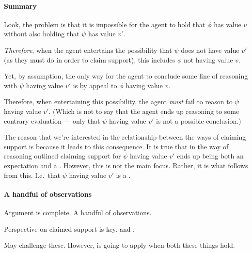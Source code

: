 \paragraph{Summary}

\begin{note}[To summarise]
  Look, the problem is that it is impossible for the agent to hold that \(\phi\) has value \(v\) without also holding that \(\psi\) has value \(v'\).

  \emph{Therefore}, when the agent entertains the possibility that \(\psi\) does not have value \(v'\) (as they must do in order to claim support), this includes \(\phi\) not having value \(v\).

  Yet, by assumption, the only way for the agent to conclude some line of reasoning with \(\psi\) having value \(v'\) is by appeal to \(\phi\) having value \(v\).

  Therefore, when entertaining this possibility, the agent \emph{must} fail to reason to \(\psi\) having value \(v'\).
  (Which is not to say that the agent ends up reasoning to some contrary evaluation --- only that \(\psi\) having value \(v'\) is not a possible conclusion.)

  The reason that we're interested in the relationship between the ways of claiming support is because it leads to this consequence.
  It is true that in the way of reasoning outlined claiming support for \(\psi\) having value \(v'\) ends up being both an expectation and a \requ{}.
  However, this is not the main focus.
  Rather, it is what follows from this.
  I.e.\ that \(\psi\) having value \(v'\) is a \requ{}.
\end{note}

\newpage





\paragraph*{A handful of observations}

\begin{note}
  Argument is complete.
  A handful of observations.
\end{note}

\begin{note}
  Perspective on claimed support is key.
  \nfcs{} and \eiS{}.

  May challenge these.
  However, \nI{} is going to apply when both these things hold.
\end{note}

